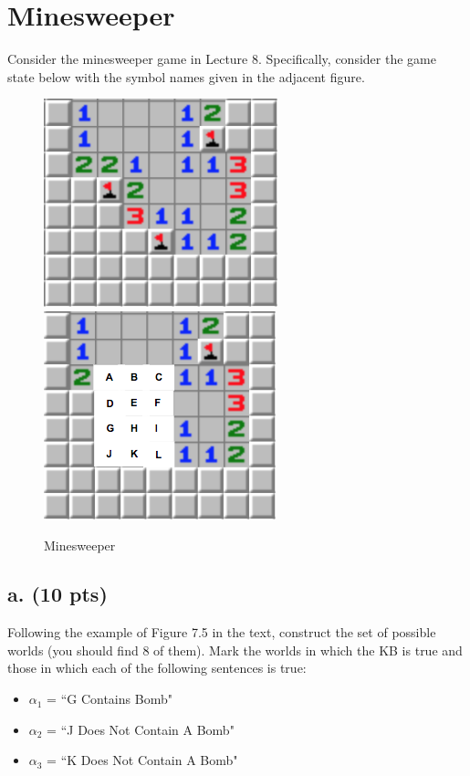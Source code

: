 \documentclass{article}
\begin{document}
\section{Minesweeper}
Consider the minesweeper game in Lecture 8. Specifically, consider the game state below with the symbol names given in the adjacent figure.
\begin{figure}[h]
    \centering
    \includegraphics{figures/minesweeper.png}
    \hspace{1.0cm}
    \includegraphics{figures/minesweeper_labels.png}
    \caption{Minesweeper}
    \label{fig:minesweeper}
\end{figure}

\subsection{a. (10 pts)} Following the example of Figure 7.5 in the text, construct the set of possible worlds (you should find 8 of them). Mark the worlds in which the KB is true and those in which each of the following sentences is true:

\begin{itemize}
    \item $\alpha_1$ = ``G Contains Bomb" \\
    \item $\alpha_2$ = ``J Does Not Contain A Bomb" \\
    \item $\alpha_3$ = ``K Does Not Contain A Bomb"
\end{itemize}
\end{document}

